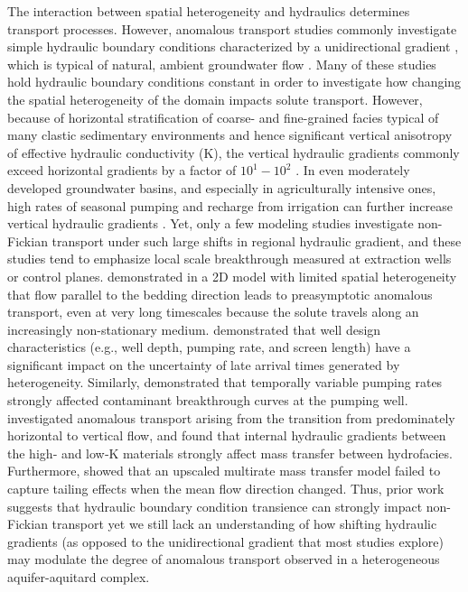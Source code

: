 The interaction between spatial heterogeneity and hydraulics determines transport processes. However, anomalous transport studies commonly investigate simple hydraulic boundary conditions characterized by a unidirectional gradient \citep{benson2001fractional, edery2014origins, edery2016structural, harvey2000rate, pedretti2014apparent, willmann2008transport, leblanc1991large, julian2001numerical, Zhang1999nonideal, henri2015random}, which is typical of natural, ambient groundwater flow \citep[e.g. a horizontal hydraulic gradient on the order of $10^{-3}$][]{Fetter2001}. Many of these studies hold hydraulic boundary conditions constant in order to investigate how changing the spatial heterogeneity of the domain impacts solute transport. However, because of horizontal stratification of coarse- and fine-grained facies typical of many clastic sedimentary environments and hence significant vertical anisotropy of effective hydraulic conductivity (K), the vertical hydraulic gradients commonly exceed horizontal gradients by a factor of $10^1 - 10^2$ \citep[e.g.][]{fogg1986groundwater, belitz1993numerical}. In even moderately developed groundwater basins, and especially in agriculturally intensive ones, high rates of seasonal pumping and recharge from irrigation can further increase vertical hydraulic gradients \citep{styles1999subsurface, gailey2018using}. Yet, only a few modeling studies investigate non-Fickian transport under such large shifts in regional hydraulic gradient, and these studies tend to emphasize local scale breakthrough measured at extraction wells or control planes. \citet{matheron1980transport} demonstrated in a 2D model with limited spatial heterogeneity that flow parallel to the bedding direction leads to preasymptotic anomalous transport, even at very long timescales because the solute travels along an increasingly non-stationary medium. \citet{henri2019stochastic} demonstrated that well design characteristics (e.g., well depth, pumping rate, and screen length) have a significant impact on the uncertainty of late arrival times generated by heterogeneity. Similarly, \citet{libera2017influence} demonstrated that temporally variable pumping rates strongly affected contaminant breakthrough curves at the pumping well. \citet{guo2019upscaling} investigated anomalous transport arising from the transition from predominately horizontal to vertical flow, and found that internal hydraulic gradients between the high‐ and low‐K materials strongly affect mass transfer between hydrofacies. Furthermore, \citep{guo2020adaptive} showed that an upscaled multirate mass transfer model failed to capture tailing effects when the mean flow direction changed. Thus, prior work suggests that hydraulic boundary condition transience can strongly impact non-Fickian transport yet we still lack an understanding of how shifting hydraulic gradients (as opposed to the unidirectional gradient that most studies explore) may modulate the degree of anomalous transport observed in a heterogeneous aquifer-aquitard complex. 

